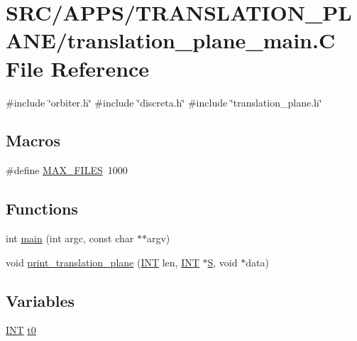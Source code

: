 \hypertarget{translation__plane__main_8_c}{}\section{S\+R\+C/\+A\+P\+P\+S/\+T\+R\+A\+N\+S\+L\+A\+T\+I\+O\+N\+\_\+\+P\+L\+A\+N\+E/translation\+\_\+plane\+\_\+main.C File Reference}
\label{translation__plane__main_8_c}
{\ttfamily \#include \char`\"{}orbiter.\+h\char`\"{}}\newline
{\ttfamily \#include \char`\"{}discreta.\+h\char`\"{}}\newline
{\ttfamily \#include \char`\"{}translation\+\_\+plane.\+h\char`\"{}}\newline
\subsection*{Macros}
\begin{DoxyCompactItemize}
\item 
\#define \mbox{\hyperlink{translation__plane__main_8_c_a2c5eecb22513a88c24ae5831a3265e54}{M\+A\+X\+\_\+\+F\+I\+L\+ES}}~1000
\end{DoxyCompactItemize}
\subsection*{Functions}
\begin{DoxyCompactItemize}
\item 
int \mbox{\hyperlink{translation__plane__main_8_c_a217dbf8b442f20279ea00b898af96f52}{main}} (int argc, const char $\ast$$\ast$argv)
\item 
void \mbox{\hyperlink{translation__plane__main_8_c_a90f5cfdf5926119896a8cd1a6b52f0ab}{print\+\_\+translation\+\_\+plane}} (\mbox{\hyperlink{galois_8h_a09fddde158a3a20bd2dcadb609de11dc}{I\+NT}} len, \mbox{\hyperlink{galois_8h_a09fddde158a3a20bd2dcadb609de11dc}{I\+NT}} $\ast$\mbox{\hyperlink{simeon_8_c_adab47f8243f1b5a2c31df2535d6b37d0}{S}}, void $\ast$data)
\end{DoxyCompactItemize}
\subsection*{Variables}
\begin{DoxyCompactItemize}
\item 
\mbox{\hyperlink{galois_8h_a09fddde158a3a20bd2dcadb609de11dc}{I\+NT}} \mbox{\hyperlink{translation__plane__main_8_c_a4268f4fe222ffb119218a0199f5e1904}{t0}}
\end{DoxyCompactItemize}


